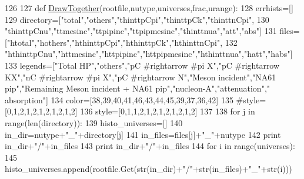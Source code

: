 \begin{DoxyCode}
126 
127 \textcolor{keyword}{def }\hyperlink{namespacedraw_uncertainties_a29036b3dc1e10114e516f30329a1432a}{DrawTogether}(rootfile,nutype,universes,frac,urange):
128     errhists=[]
129     directory=[\textcolor{stringliteral}{"total"},\textcolor{stringliteral}{"others"},\textcolor{stringliteral}{"thinttpCpi"},\textcolor{stringliteral}{"thinttpCk"},\textcolor{stringliteral}{"thinttnCpi"},
130                \textcolor{stringliteral}{"thinttpCnu"},\textcolor{stringliteral}{"ttmesinc"},\textcolor{stringliteral}{"ttpipinc"},\textcolor{stringliteral}{"ttpipmesinc"},\textcolor{stringliteral}{"thinttnua"},\textcolor{stringliteral}{"att"},\textcolor{stringliteral}{"abs"}]
131     files=[\textcolor{stringliteral}{"htotal"},\textcolor{stringliteral}{"hothers"},\textcolor{stringliteral}{"hthinttpCpi"},\textcolor{stringliteral}{"hthinttpCk"},\textcolor{stringliteral}{"hthinttnCpi"},
132                \textcolor{stringliteral}{"hthinttpCnu"},\textcolor{stringliteral}{"httmesinc"},\textcolor{stringliteral}{"httpipinc"},\textcolor{stringliteral}{"httpipmesinc"},\textcolor{stringliteral}{"hthinttnua"},\textcolor{stringliteral}{"hatt"},\textcolor{stringliteral}{"habs"}]
133     legends=[\textcolor{stringliteral}{"Total HP"},\textcolor{stringliteral}{"others"},\textcolor{stringliteral}{"pC #rightarrow #pi X"},\textcolor{stringliteral}{"pC #rightarrow KX"},\textcolor{stringliteral}{"nC #rightarrow #pi X"},\textcolor{stringliteral}{"pC
       #rightarrow N"},\textcolor{stringliteral}{"Meson incident"},\textcolor{stringliteral}{"NA61 pip"},\textcolor{stringliteral}{"Remaining Meson incident + NA61 pip"},\textcolor{stringliteral}{"nucleon-A"},\textcolor{stringliteral}{"attenuation"},\textcolor{stringliteral}{"
      absorption"}]
134     color=[38,39,40,41,46,43,44,45,39,37,36,42]
135     \textcolor{comment}{#style=[0,1,2,1,2,1,2,1,2,1,2]}
136     style=[0,1,1,2,1,2,1,2,1,2,1,2]
137 
138     \textcolor{keywordflow}{for} j \textcolor{keywordflow}{in} range(len(directory)):
139         histo\_universes=[]
140         in\_dir=nutype+\textcolor{stringliteral}{"\_"}+directory[j]
141         in\_files=files[j]+\textcolor{stringliteral}{"\_"}+nutype
142         \textcolor{keywordflow}{print} in\_dir+\textcolor{stringliteral}{"/"}+in\_files
143         \textcolor{keywordflow}{print} in\_dir+\textcolor{stringliteral}{"/"}+in\_files
144         \textcolor{keywordflow}{for} i \textcolor{keywordflow}{in} range(universes):
145             histo\_universes.append(rootfile.Get(str(in\_dir)+\textcolor{stringliteral}{"/"}+str(in\_files)+\textcolor{stringliteral}{"\_"}+str(i)))

\end{DoxyCode}
